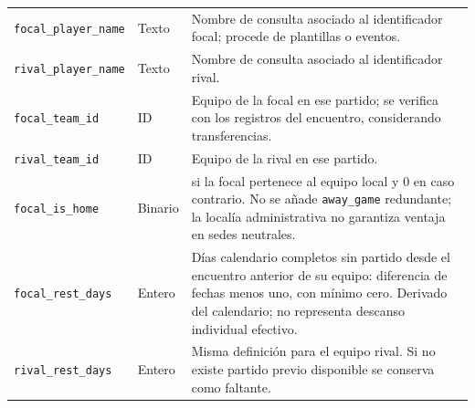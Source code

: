 \begin{longtable}{@{}>{\raggedright\arraybackslash}p{5.0cm}>{\raggedright\arraybackslash}p{1.9cm}>{\raggedright\arraybackslash}p{7.7cm}@{}}
\texttt{focal\_\allowbreak player\_\allowbreak name} & Texto & Nombre de consulta asociado al identificador focal; procede de plantillas o eventos.\\
\texttt{rival\_\allowbreak player\_\allowbreak name} & Texto & Nombre de consulta asociado al identificador rival.\\
\texttt{focal\_\allowbreak team\_\allowbreak id} & ID & Equipo de la focal en ese partido; se verifica con los registros del encuentro, considerando transferencias.\\
\texttt{rival\_\allowbreak team\_\allowbreak id} & ID & Equipo de la rival en ese partido.\\
\texttt{focal\_\allowbreak is\_\allowbreak home} & Binario & 1 si la focal pertenece al equipo local y 0 en caso contrario. No se añade \texttt{away\_\allowbreak game} redundante; la localía administrativa no garantiza ventaja en sedes neutrales.\\
\texttt{focal\_\allowbreak rest\_\allowbreak days} & Entero & Días calendario completos sin partido desde el encuentro anterior de su equipo: diferencia de fechas menos uno, con mínimo cero. Derivado del calendario; no representa descanso individual efectivo.\\
\texttt{rival\_\allowbreak rest\_\allowbreak days} & Entero & Misma definición para el equipo rival. Si no existe partido previo disponible se conserva como faltante.\\
\end{longtable}
\endgroup

